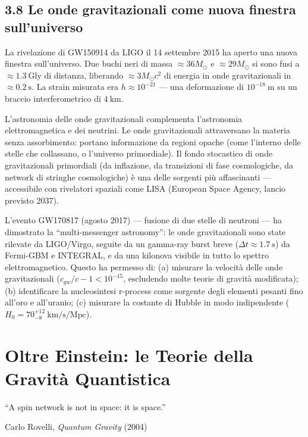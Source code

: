 \documentclass[11.5pt,a4paper,openany]{book}
\theoremstyle{remark}
\begin{document}
\section{3.8 Le onde gravitazionali come nuova finestra sull'universo}

La rivelazione di GW150914 da LIGO il 14 settembre 2015 ha aperto una nuova finestra sull'universo. Due buchi neri di massa $\approx 36 M_\odot$ e $\approx 29 M_\odot$ si sono fusi a $\approx 1.3\ \text{Gly}$ di distanza, liberando $\approx 3 M_\odot c^2$ di energia in onde gravitazionali in $\approx 0.2\ \text{s}$. La strain misurata era $h \approx 10^{-21}$ --- una deformazione di $10^{-18}\ \text{m}$ su un braccio interferometrico di $4\ \text{km}$.

L'astronomia delle onde gravitazionali complementa l'astronomia elettromagnetica e dei neutrini. Le onde gravitazionali attraversano la materia senza assorbimento: portano informazione da regioni opache (come l'interno delle stelle che collassano, o l'universo primordiale). Il fondo stocastico di onde gravitazionali primordiali (da inflazione, da transizioni di fase cosmologiche, da network di stringhe cosmologiche) è una delle sorgenti più affascinanti --- accessibile con rivelatori spaziali come LISA (European Space Agency, lancio previsto 2037).

L'evento GW170817 (agosto 2017) --- fusione di due stelle di neutroni --- ha dimostrato la ``multi-messenger astronomy'': le onde gravitazionali sono state rilevate da LIGO/Virgo, seguite da un gamma-ray burst breve ($\Delta t \approx 1.7\ \text{s}$) da Fermi-GBM e INTEGRAL, e da una kilonova visibile in tutto lo spettro elettromagnetico. Questo ha permesso di: (a) misurare la velocità delle onde gravitazionali ($c_{gw}/c - 1 < 10^{-15}$, escludendo molte teorie di gravità modificata); (b) identificare la nucleosintesi r-process come sorgente degli elementi pesanti fino all'oro e all'uranio; (c) misurare la costante di Hubble in modo indipendente ($H_0 = 70^{+12}_{-8}\ \text{km/s/Mpc}$).

\chapter{Oltre Einstein: le Teorie della Gravità Quantistica}

\epigraph{``A spin network is not in space: it is space.''}{Carlo Rovelli, \textit{Quantum Gravity} (2004)}
\end{document}
